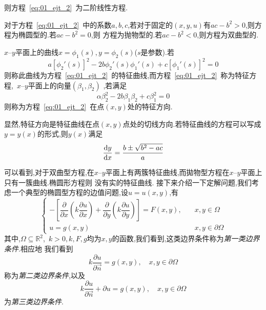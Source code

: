 则方程~\ref{eq:01_ejt_2}~为二阶线性方程.\par
对于方程~\ref{eq:01_ejt_2}~中的系数$a,b,c$,若对于固定的$(x,y,u)$有$ac-b^2>0$,则方程为椭圆型的.若$ac-b^2=0$,则
方程为抛物型的.若$ac-b^2<0$,则方程为双曲型的.\par
$x$--$y$平面上的曲线$x=\phi_1(s),y=\phi_2(s)$($s$是参数).若
\begin{equation}
 a[\phi_2'(s)]^2-2b\phi_2'(s)\phi_1'(s)+c[\phi_1'(s)]^2=0
\end{equation}
则称此曲线为方程~\ref{eq:01_ejt_2}~的特征曲线,而方程~\ref{eq:01_ejt_2}~称为特征方程,~$x$--$y$平面上的向量$(\beta_1,\beta_2)$
,若满足
\begin{equation}
 \alpha\beta_2^2-2b\beta_1\beta_2+c\beta_1^2=0
\end{equation}
则称为方程~\ref{eq:01_ejt_2}~在点$(x,y)$处的特征方向.\par
显然,特征方向是特征曲线在点$(x,y)$点处的切线方向.若特征曲线的方程可以写成$y=y(x)$的形式,则$y(x)$满足
\begin{equation}
 \dfrac{\mathrm{d} y}{\mathrm{d} x}=\dfrac{b\pm\sqrt{b^2-ac}}{a}
\end{equation}\par
可以看到,对于双曲型方程,在$x$--$y$平面上有两簇特征曲线,而拋物型方程在$x$--$y$平面上只有一簇曲线.椭圆形方程则
没有实的特征曲线.
接下来介绍一下定解问题,我们考虑一个典型的椭圆型方程的边值问题,设$u=u(x,y)$,有
\begin{equation}
 \begin{cases}
  -\left[\dfrac{\partial}{\partial x}\left(k\dfrac{\partial u}{\partial x}\right)+
  \dfrac{\partial}{\partial y}\left(k\dfrac{\partial u}{\partial y}\right)\right]=F(x,y)
  ,&	\quad x,y \in \Omega \\[1em]
  u=g(x,y)	& \quad	x,y\in \partial \Omega
 \end{cases}
\end{equation}
其中,$\Omega\subseteq\mathbb{R}^2$,~$k>0,k,F,g$均为$x,y$的函数,我们看到,这类边界条件称为\emph{第一类边界条件}.相应地
我们看到
\begin{equation}
 k\dfrac{\partial u}{\partial \vec{n}}=g(x,y),\quad x,y\in\partial\Omega
\end{equation}
称为\emph{第二类边界条件},以及
\begin{equation}
 k\dfrac{\partial u}{\partial \vec{n}}+\partial u=g(x,y),\quad x,y\in\partial\Omega
\end{equation}
为\emph{第三类边界条件}.
